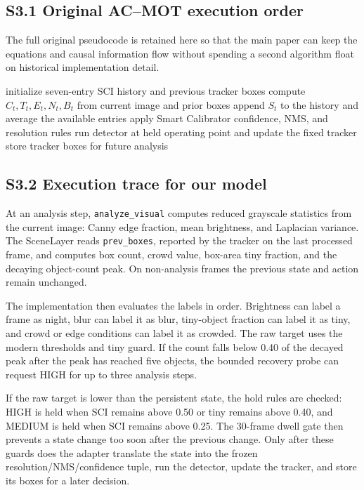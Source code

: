\documentclass[11pt]{article}
\begin{document}
\subsection*{S3.1 Original AC--MOT execution order}
The full original pseudocode is retained here so that the main paper can keep
the equations and causal information flow without spending a second algorithm
float on historical implementation detail.

\begin{algorithm}[ht]
\caption{Original AC--MOT controller}
\label{alg:s3-original}
\begin{algorithmic}[1]
\State initialize seven-entry SCI history and previous tracker boxes
\State compute $C_t,T_t,E_t,N_t,B_t$ from current image and prior boxes
\State append $S_t$ to the history and average the available entries
\State apply Smart Calibrator confidence, NMS, and resolution rules
\EndIf
\State run detector at held operating point and update the fixed tracker
\State store tracker boxes for future analysis
\EndFor
\end{algorithmic}
\end{algorithm}

\subsection*{S3.2 Execution trace for our model}
At an analysis step, \texttt{analyze\_visual} computes reduced grayscale
statistics from the current image: Canny edge fraction, mean brightness, and
Laplacian variance. The SceneLayer reads \texttt{prev\_boxes}, reported by the
tracker on the last processed frame, and computes box count, crowd value,
box-area tiny fraction, and the decaying object-count peak. On non-analysis
frames the previous state and action remain unchanged.

The implementation then evaluates the labels in order. Brightness can label a
frame as night, blur can label it as blur, tiny-object fraction can label it as
tiny, and crowd or edge conditions can label it as crowded. The raw target uses
the modern thresholds and tiny guard. If the count falls below 0.40 of the
decayed peak after the peak has reached five objects, the bounded recovery probe
can request HIGH for up to three analysis steps.

If the raw target is lower than the persistent state, the hold rules are
checked: HIGH is held when SCI remains above 0.50 or tiny remains above 0.40,
and MEDIUM is held when SCI remains above 0.25. The 30-frame dwell gate then
prevents a state change too soon after the previous change. Only after these
guards does the adapter translate the state into the frozen
resolution/NMS/confidence tuple, run the detector, update the tracker, and store
its boxes for a later decision.
\end{document}
